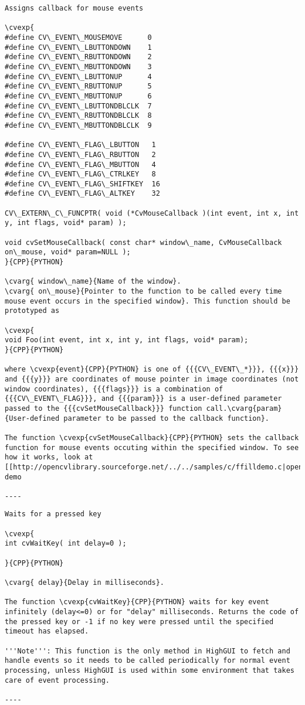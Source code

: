 \begin{verbatim}
Assigns callback for mouse events

\cvexp{
#define CV\_EVENT\_MOUSEMOVE      0
#define CV\_EVENT\_LBUTTONDOWN    1
#define CV\_EVENT\_RBUTTONDOWN    2
#define CV\_EVENT\_MBUTTONDOWN    3
#define CV\_EVENT\_LBUTTONUP      4
#define CV\_EVENT\_RBUTTONUP      5
#define CV\_EVENT\_MBUTTONUP      6
#define CV\_EVENT\_LBUTTONDBLCLK  7
#define CV\_EVENT\_RBUTTONDBLCLK  8
#define CV\_EVENT\_MBUTTONDBLCLK  9

#define CV\_EVENT\_FLAG\_LBUTTON   1
#define CV\_EVENT\_FLAG\_RBUTTON   2
#define CV\_EVENT\_FLAG\_MBUTTON   4
#define CV\_EVENT\_FLAG\_CTRLKEY   8
#define CV\_EVENT\_FLAG\_SHIFTKEY  16
#define CV\_EVENT\_FLAG\_ALTKEY    32

CV\_EXTERN\_C\_FUNCPTR( void (*CvMouseCallback )(int event, int x, int y, int flags, void* param) );

void cvSetMouseCallback( const char* window\_name, CvMouseCallback on\_mouse, void* param=NULL );
}{CPP}{PYTHON}

\cvarg{ window\_name}{Name of the window}.
\cvarg{ on\_mouse}{Pointer to the function to be called every time mouse event occurs in the specified window}. This function should be prototyped as

\cvexp{
void Foo(int event, int x, int y, int flags, void* param);
}{CPP}{PYTHON}

where \cvexp{event}{CPP}{PYTHON} is one of {{{CV\_EVENT\_*}}}, {{{x}}} and {{{y}}} are coordinates of mouse pointer in image coordinates (not window coordinates), {{{flags}}} is a combination of {{{CV\_EVENT\_FLAG}}}, and {{{param}}} is a user-defined parameter passed to the {{{cvSetMouseCallback}}} function call.\cvarg{param}{User-defined parameter to be passed to the callback function}.

The function \cvexp{cvSetMouseCallback}{CPP}{PYTHON} sets the callback function for mouse events occuting within the specified window. To see how it works, look at [[http://opencvlibrary.sourceforge.net/../../samples/c/ffilldemo.c|opencv/samples/c/ffilldemo.c]] demo

----
\end{verbatim}
\begin{verbatim}
Waits for a pressed key

\cvexp{
int cvWaitKey( int delay=0 );

}{CPP}{PYTHON}

\cvarg{ delay}{Delay in milliseconds}.

The function \cvexp{cvWaitKey}{CPP}{PYTHON} waits for key event infinitely (delay<=0) or for "delay" milliseconds. Returns the code of the pressed key or -1 if no key were pressed until the specified timeout has elapsed.

'''Note''': This function is the only method in HighGUI to fetch and handle events so it needs to be called periodically for normal event processing, unless HighGUI is used within some environment that takes care of event processing.

----
\end{verbatim}
